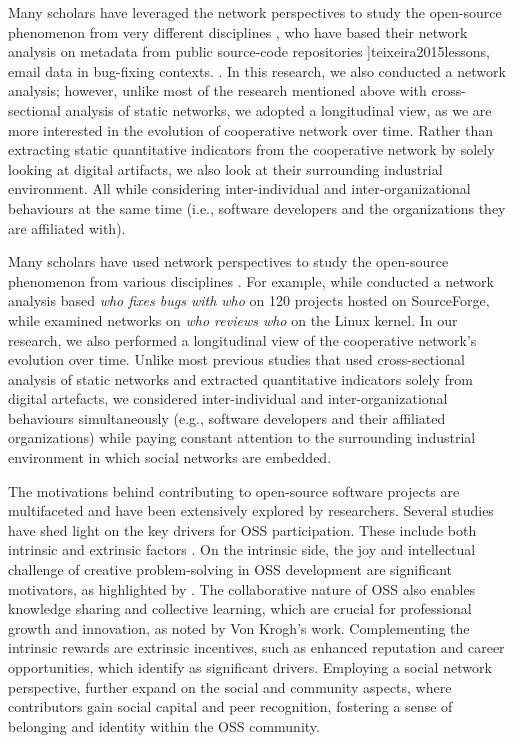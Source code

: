 \documentclass[CHICAGO,Times1COL]{WileyNJDv5} %
\begin{document}
Many scholars have leveraged the network perspectives to study the open-source phenomenon from
very different disciplines \citep{HerboldAmirfallah_et_al2021},
who have based their network analysis on metadata from public source-code repositories ]{teixeira2015lessons}, email data in bug-fixing contexts.
\citep[e.g.,][]{crowston_social_2005,stam2008entrepreneurial}.  In this research, we also conducted a network analysis; however, unlike most of the research mentioned above with cross-sectional analysis of static networks, we adopted
a longitudinal view, as we are more interested in the evolution of cooperative network over time. Rather than extracting static quantitative indicators from the
cooperative network by solely looking at digital artifacts, we also look at their surrounding industrial environment. All while considering inter-individual and inter-organizational behaviours at the same time (i.e., software developers and the organizations they are affiliated with).

Many scholars have used network perspectives to study the open-source phenomenon from various disciplines \citep{HerboldAmirfallah_et_al2021}. For example, while \citet{crowston_social_2005} conducted a network analysis based \textit{who fixes bugs with who} on 120 projects hosted on SourceForge,  while \citet{teixeira_et_al2020_homophily_linux_kernel} examined networks on \textit{who reviews who} on the  Linux kernel. In our research, we also performed a longitudinal view of the cooperative network's evolution over time. Unlike most previous studies that used cross-sectional analysis of static networks and extracted quantitative indicators solely from digital artefacts, we considered inter-individual and inter-organizational behaviours simultaneously  (e.g., software developers and their affiliated organizations) while paying constant attention to the surrounding industrial environment in which social networks are embedded. 

The motivations behind contributing to open-source software projects are multifaceted and have been extensively explored by researchers. Several studies    have shed light on the key drivers for OSS participation. These include both intrinsic and extrinsic factors \citep[see][]{KroghHippel2003,VonKrogh_and_VonHippel2006,Fang_and_Neufeld2009,Roberts_et_al2006,CrowstonWei_et_al2012}. On the intrinsic side, the joy and intellectual challenge of creative problem-solving in OSS development are significant motivators, as highlighted by \citet{VonKrogh_and_VonHippel2006}. The collaborative nature of OSS also enables knowledge sharing and collective learning, which are crucial for professional growth and innovation, as noted by Von Krogh's work. Complementing the intrinsic rewards are extrinsic incentives, such as enhanced reputation and career opportunities, which \citet{KroghHippel2003} identify as significant drivers. Employing a social network perspective,  \citet{Fang_and_Neufeld2009} further expand on the social and community aspects, where contributors gain social capital and peer recognition, fostering a sense of belonging and identity within the OSS community.
\end{document}
